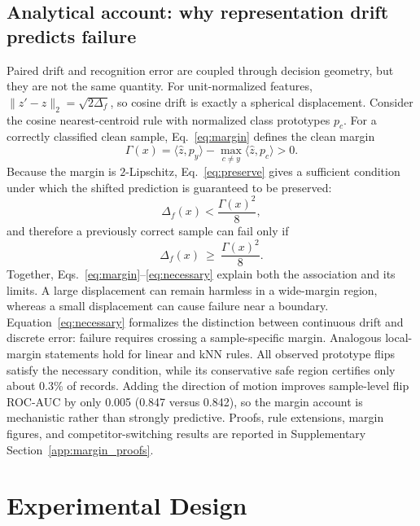 \documentclass[a4paper,fleqn]{els-cas-templates/cas-sc}
\begin{document}
\subsection{Analytical account: why representation drift predicts failure}
\label{sec:analytical}

Paired drift and recognition error are coupled through decision geometry, but
they are not the same quantity. For unit-normalized features,
$\|\hat z'-\hat z\|_2=\sqrt{2\Delta_f}$, so cosine drift is exactly a spherical
displacement. Consider the cosine nearest-centroid rule with normalized class
prototypes $p_c$. For a correctly classified clean sample, Eq.~\eqref{eq:margin}
defines the clean margin
\begin{equation}
  \Gamma(x)=\langle \hat z,p_y\rangle-\max_{c\neq y}\langle \hat z,p_c\rangle>0 .
  \label{eq:margin}
\end{equation}
Because the margin is $2$-Lipschitz, Eq.~\eqref{eq:preserve} gives a sufficient
condition under which the shifted prediction is guaranteed to be preserved:
\begin{equation}
  \Delta_f(x) < \frac{\Gamma(x)^2}{8},
  \label{eq:preserve}
\end{equation}
and therefore a previously correct sample can fail only if
\begin{equation}
  \Delta_f(x)\ \ge\ \frac{\Gamma(x)^2}{8}.
  \label{eq:necessary}
\end{equation}
Together, Eqs.~\eqref{eq:margin}--\eqref{eq:necessary} explain both the
association and its limits. A large displacement can remain harmless in a
wide-margin region, whereas a small displacement can cause failure near a
boundary. Equation~\eqref{eq:necessary} formalizes the distinction between
continuous drift and discrete error: failure requires crossing a
sample-specific margin. Analogous local-margin statements hold for linear and
kNN rules. All observed prototype flips satisfy the necessary
condition, while its conservative safe region certifies only about 0.3\% of
records. Adding the direction of motion
improves sample-level flip ROC-AUC by only 0.005 (0.847 versus 0.842), so the margin account is
mechanistic rather than strongly predictive. Proofs, rule extensions,
margin figures, and competitor-switching results are reported in Supplementary
Section~\ref{app:margin_proofs}.

\section{Experimental Design}
\end{document}
